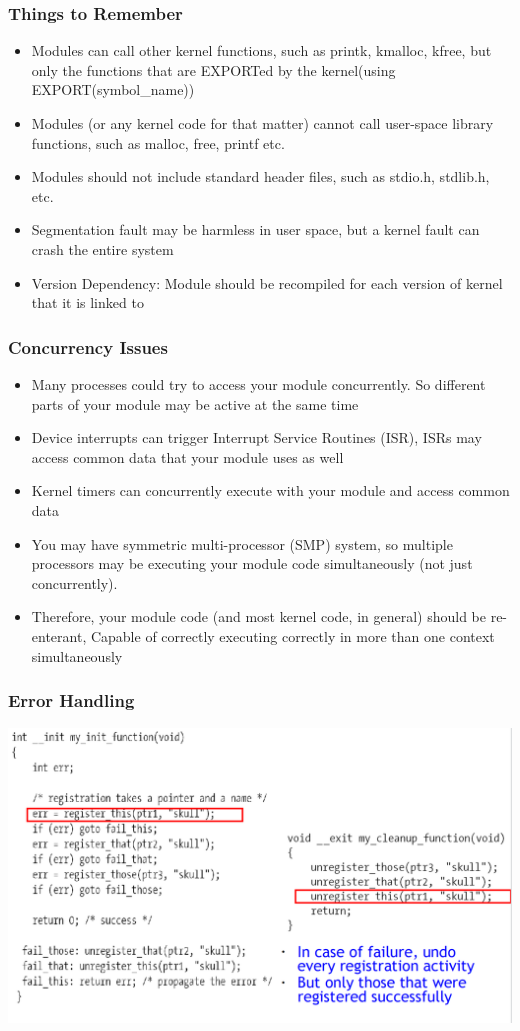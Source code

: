 \documentclass[12pt]{article}
\begin{document}
\subsubsection{Things to Remember}
\begin{itemize}
    \item Modules can call other kernel functions, such as printk, kmalloc, kfree, but only the functions that are EXPORTed by the kernel(using EXPORT(symbol\_name))
    \item Modules (or any kernel code for that matter) cannot call user-space library functions, such as  malloc, free, printf etc.
    \item Modules should not include standard header files, such as stdio.h, stdlib.h, etc.
    \item Segmentation fault may be harmless in user space, but a kernel fault can crash the entire system
    \item Version Dependency: Module should be recompiled for each version of kernel that it is linked to
\end{itemize}
\subsubsection{Concurrency Issues}
\begin{itemize}
    \item Many processes could try to access your module concurrently. So different parts of your module may be active at the same time
    \item Device interrupts can trigger Interrupt Service Routines (ISR), ISRs may access common data that your module uses as well
    \item Kernel timers can concurrently execute with your module and access common data
    \item You may have symmetric multi-processor (SMP) system, so multiple processors may be executing your module code simultaneously (not just concurrently).
    \item Therefore, your module code (and most kernel code, in general) should be re-enterant, Capable of correctly executing correctly in more than one context simultaneously
\end{itemize}
\subsubsection{Error Handling}
\includegraphics[width=\textwidth]{KernelErrorHandling.png}
\end{document}
